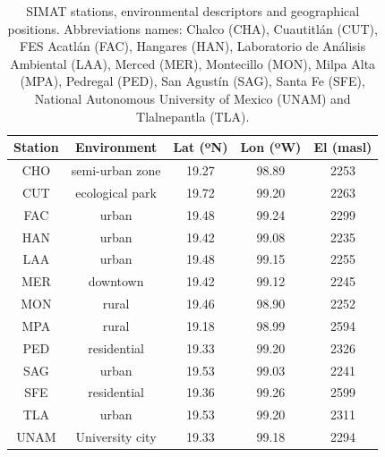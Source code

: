 \documentclass[journal=jacsat,manuscript=article]{achemso}
\begin{document}
\begin{table}[H]
  \centering
  \begin{tabular}{ccccc}
    \hline
    Station & Environment     & Lat (ºN) & Lon (ºW) & El (masl) \\ \hline
    CHO     & semi-urban zone & 19.27    & 98.89    & 2253      \\
    CUT     & ecological park & 19.72    & 99.20    & 2263      \\
    FAC     & urban           & 19.48    & 99.24    & 2299      \\
    HAN     & urban           & 19.42    & 99.08    & 2235      \\
    LAA     & urban           & 19.48    & 99.15    & 2255      \\
    MER     & downtown        & 19.42    & 99.12    & 2245      \\
    MON     & rural           & 19.46    & 98.90    & 2252      \\
    MPA     & rural           & 19.18    & 98.99    & 2594      \\
    PED     & residential     & 19.33    & 99.20    & 2326      \\
    SAG     & urban           & 19.53    & 99.03    & 2241      \\
    SFE     & residential     & 19.36    & 99.26    & 2599      \\
    TLA     & urban           & 19.53    & 99.20    & 2311      \\
    UNAM    & University city & 19.33    & 99.18    & 2294      \\\hline
  \end{tabular}
  \caption{{{{SIMAT stations, environmental descriptors and geographical
                positions. Abbreviations names: Chalco (CHA), Cuautitlán (CUT), FES Acatlán
                (FAC), Hangares (HAN), Laboratorio de Análisis Ambiental (LAA), Merced
                (MER), Montecillo (MON), Milpa Alta (MPA), Pedregal (PED), San Agustín
                (SAG), Santa Fe (SFE), National Autonomous University of Mexico (UNAM) and
                Tlalnepantla (TLA). }}}}
  \label{table:stations}
\end{table}
\end{document}
